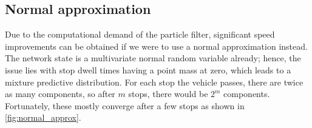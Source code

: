 \subsection{Normal approximation}
\label{sec:prediction_arrival_time_normal}

Due to the computational demand of the particle filter, significant speed improvements can be obtained if we were to use a normal approximation instead. The network state is a multivariate normal random variable already; hence, the issue lies with stop dwell times having a point mass at zero, which leads to a mixture predictive distribution. For each stop the vehicle passes, there are twice as many components, so after $m$ stops, there would be $2^m$ components. Fortunately, these mostly converge after a few stops as shown in \cref{fig:normal_approx}.

